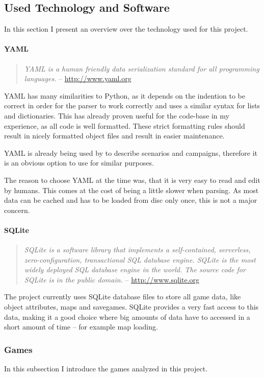\subsection{Used Technology and Software}
In this section I present an overview over the technology used for this project.

\paragraph{YAML}
\begin{quote}
\textit{YAML is a human friendly data serialization standard for all programming languages.} -- \url{http://www.yaml.org}
\end{quote}
YAML has many similarities to Python, as it depends on the indention to be correct in order for the parser to work
correctly and uses a similar syntax for lists and dictionaries. This has already proven useful for the \UH{} code-base
in my experience, as all code is well formatted. These strict formatting rules should result in nicely formatted object
files and result in easier maintenance.

YAML is already being used by \UH{} to describe scenarios and campaigns, therefore it is an obvious option to use for
similar purposes.

The reason to choose YAML at the time was, that it is very easy to read and edit by humans. This comes at the cost of
being a little slower when parsing. As most data can be cached and has to be loaded from disc only once, this is not a
major concern.

\paragraph{SQLite}
\begin{quote}
\textit{SQLite is a software library that implements a self-contained, serverless, zero-configuration, transactional SQL
database engine. SQLite is the most widely deployed SQL database engine in the world. The source code for SQLite is in
the public domain.} -- \url{http://www.sqlite.org}
\end{quote}

The \UH{} project currently uses SQLite database files to store all game data, like object attributes, maps and
savegames. SQLite provides a very fast access to this data, making it a good choice where big amounts of data have to
accessed in a short amount of time -- for example map loading.

\subsubsection{Games}
In this subsection I introduce the games analyzed in this project.


